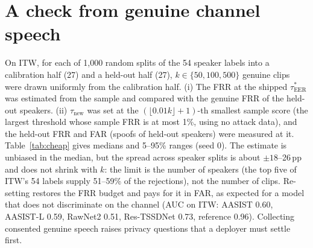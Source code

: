 \documentclass[10pt]{article}
\newcommand{\tauE}{\tau^{*}_{\mathrm{EER}}}
\newcommand{\wide}[1]{\begingroup\footnotesize\setlength{\tabcolsep}{3.5pt}\resizebox{\textwidth}{!}{}\endgroup}
\begin{document}
\begin{table}[!ht]
\caption{Dev EER and thresholds before and after trimming (the trimmed thresholds are computed from trimmed dev scores only).}
\label{tab:trimdev}
\centering
\footnotesize

\end{table}

\begin{table}[!ht]
\caption{Trimming both ends of every clip (\(T=35\)\,dB), LA19 evaluation and ITW. Columns three to five: FRR/FAR (\%) with (HTER \%, TTG pp) at
the registered threshold on untrimmed audio, at the same threshold on trimmed audio, and at the threshold re-set on trimmed dev scores (trimmed
audio).}
\label{tab:trim}
\centering
\wide{s_tab_trim}
\end{table}

\section{A check from genuine channel speech}
\label{sec:cheap}
On ITW, for each of 1,000 random splits of the 54 speaker labels into a calibration half (27) and a held-out half (27), \(k\in\{50,100,500\}\)
genuine clips were drawn uniformly from the calibration half. (i) The FRR at the shipped \(\tauE\) was estimated from the sample and compared
with the genuine FRR of the held-out speakers. (ii) \(\tau_{\mathrm{new}}\) was set at the \((\lfloor 0.01k\rfloor+1)\)-th smallest sample
score (the largest threshold whose sample FRR is at most 1\%, using no attack data), and the held-out FRR and FAR (spoofs of held-out speakers) were
measured at it. Table~\ref{tab:cheap} gives medians and 5--95\% ranges (seed 0). The estimate is unbiased in the median, but the spread across
speaker splits is about \(\pm18\)--26\,pp and does not shrink with \(k\): the limit is the number of speakers (the top five of ITW's 54
labels supply 51--59\% of the rejections), not the number of clips. Re-setting restores the FRR budget and pays for it in FAR, as expected
for a model that does not discriminate on the channel (AUC on ITW: AASIST 0.60, AASIST-L 0.59, RawNet2 0.51, Res-TSSDNet 0.73, reference 0.96).
Collecting consented genuine speech raises privacy questions that a deployer must settle first.

\begin{table}[!ht]
\caption{Genuine-speech check on ITW (1,000 speaker-disjoint splits). Estimate error = FRR estimated from the \(k\) calibration clips at the
shipped threshold minus the held-out FRR at it.}
\label{tab:cheap}
\centering
\wide{s_tab_cheap}
\end{table}
\end{document}

